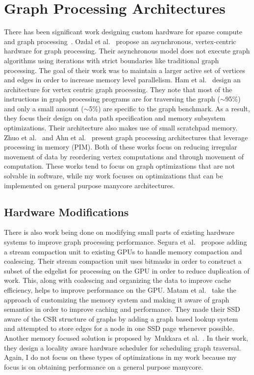 \section{Graph Processing Architectures} There has been significant work designing custom hardware for sparse compute and graph processing~\cite{ham2016graphicionado, jeffrey2015scalable, li2018graphia, dai2018graphh, addisie2018heterogeneous, yao2018efficient, ahn2016scalable}.
Ozdal et al.~\cite{ozdal2016energy} propose an asynchronous, vertex-centric hardware for graph processing. 
Their asynchronous model does not execute graph algorithms using iterations with strict boundaries like traditional graph processing. 
The goal of their work was to maintain a larger active set of vertices and edges in order to increase memory level parallelism. 
Ham et al.~\cite{ham2016graphicionado} design an architecture for vertex centric graph processing. 
They note that most of the instructions in graph processing programs are for traversing the graph ($\sim$95\%) and only a small amount ($\sim$5\%) are specific to the graph benchmark. 
As a result, they focus their design on data path specification and memory subsystem optimizations.
Their architecture also makes use of small scratchpad memory.
Zhuo et al.~\cite{zhuo2019graphq} and Ahn et al.~\cite{ahn2016scalable} present graph processing architectures that leverage processing in memory (PIM).
Both of these works focus on reducing irregular movement of data by reordering vertex computations and through movement of computation.
These works tend to focus on graph optimizations that are not solvable in software, while my work focuses on optimizations that can be implemented on general purpose manycore architectures.

\subsection{Hardware Modifications} There is also work being done on modifying small parts of existing hardware systems to improve graph processing performance. 
Segura et al.~\cite{segura2019scu} propose adding a stream compaction unit to existing GPUs to handle memory compaction and coalescing.
Their stream compaction unit uses bitmasks in order to construct a subset of the edgelist for processing on the GPU in order to reduce duplication of work. 
This, along with coalescing and organizing the data to improve cache efficiency, helps to improve performance on the GPU.
Matam et al.~\cite{matam2019graphssd} take the approach of customizing the memory system and making it aware of graph semantics in order to improve caching and performance. 
They made their SSD aware of the CSR structure of graphs by adding a graph based lookup system and attempted to store edges for a node in one SSD page whenever possible.
Another memory focused solution is proposed by~Mukkara et al.~\cite{mukkara2018exploiting}.
In their work, they design a locality aware hardware scheduler for scheduling graph traversal.
Again, I do not focus on these types of optimizations in my work because my focus is on obtaining performance on a general purpose manycore.

